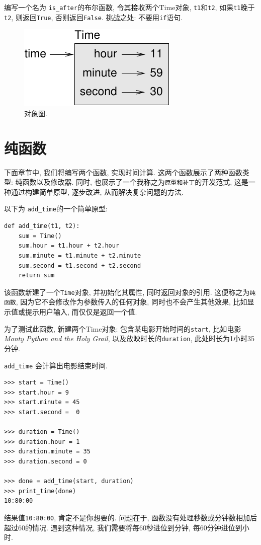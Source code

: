 \documentclass[10pt]{book}
\begin{document}
编写一个名为 \verb"is_after"的布尔函数, 
令其接收两个Time对象, {\tt t1}和{\tt t2}, 
如果{\tt t1}晚于{\tt t2}, 则返回{\tt True}, 否则返回{\tt False}. 
挑战之处: 不要用{\tt if}语句. 

\begin{figure}
\centerline
{\includegraphics[scale=0.8]{figs/time.pdf}}
\caption{对象图.}
\label{fig.time}
\end{figure}


\section{纯函数}

下面章节中, 我们将编写两个函数, 实现时间计算. 
这两个函数展示了两种函数类型: 纯函数以及修改器. 
同时, 也展示了一个我称之为{\tt 原型和补丁}的开发范式, 
这是一种通过构建简单原型, 逐步改进, 从而解决复杂问题的方法. 

以下为 \verb"add_time"的一个简单原型:

\begin{verbatim}
def add_time(t1, t2):
    sum = Time()
    sum.hour = t1.hour + t2.hour
    sum.minute = t1.minute + t2.minute
    sum.second = t1.second + t2.second
    return sum
\end{verbatim}
%
该函数新建了一个{\tt Time}对象, 并初始化其属性, 同时返回对象的引用. 
这便称之为{\tt 纯函数}, 因为它不会修改作为参数传入的任何对象, 
同时也不会产生其他效果, 比如显示值或提示用户输入, 而仅仅是返回一个值. 

为了测试此函数, 新建两个Time对象: 包含某电影开始时间的{\tt start}, 
比如电影{\em Monty Python and the Holy Grail},  
以及放映时长的{\tt duration}, 此处时长为1小时35分钟. 

\verb"add_time" 会计算出电影结束时间. 

\begin{verbatim}
>>> start = Time()
>>> start.hour = 9
>>> start.minute = 45
>>> start.second =  0

>>> duration = Time()
>>> duration.hour = 1
>>> duration.minute = 35
>>> duration.second = 0

>>> done = add_time(start, duration)
>>> print_time(done)
10:80:00
\end{verbatim}
%
结果值{\tt 10:80:00}, 肯定不是你想要的. 
问题在于, 函数没有处理秒数或分钟数相加后超过60的情况. 
遇到这种情况, 我们需要将每60秒进位到分钟, 
每60分钟进位到小时. 
\end{document}
